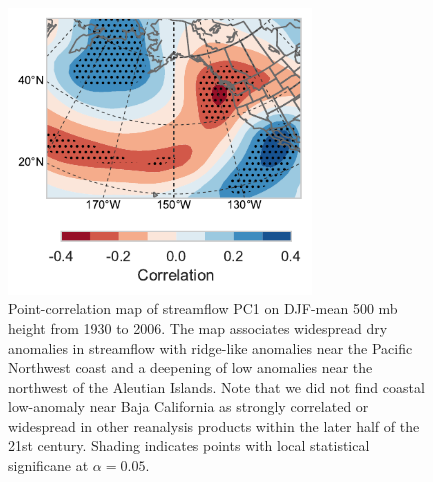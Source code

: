 \documentclass[final, double]{ua-thesis}
\begin{document}
\begin{figure}[ht]
 \centerline{\includegraphics[width=19pc]{p2figures/fig_streamflow_pc_hgt.pdf}}
  \caption{Point-correlation map of streamflow PC1 on DJF-mean 500 mb height from 1930 to 2006. The map associates widespread dry anomalies in streamflow with ridge-like anomalies near the Pacific Northwest coast and a deepening of low anomalies near the northwest of the Aleutian Islands. Note that we did not find coastal low-anomaly near Baja California as strongly correlated or widespread in other reanalysis products within the later half of the 21st century. Shading indicates points with local statistical significane at $\alpha = 0.05$.}\label{fig_streamflow_pc_hgt}
\end{figure}
\end{document}
